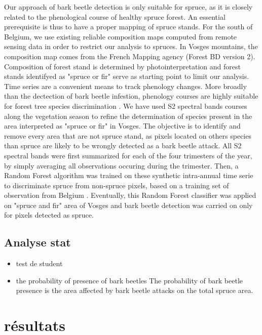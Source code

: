 \documentclass[3p,times]{elsarticle}
\begin{document}
Our approach of bark beetle detection is only suitable for spruce, as it is closely related to the phenological course of healthy spruce forest.
An essential prerequisite is thus to have a proper mapping of spruce stands.
For the south of Belgium, we use existing reliable composition maps \citep{bolyn_forest_2018} computed from remote sensing data in order to restrict our analysis to spruces.
In Vosges mountains, the composition map comes from the French Mapping agency (Forest BD version 2). 
Composition of forest stand is determined by photointerpretation and forest stands identifyed as "spruce or fir" serve as starting point to limit our analysis.
Time series are a convenient means to track phenology changes. 
More broadly than the dectection of bark beetle infestion, phenology courses are highly suitable for forest tree species discrimination \citep{lisein_discrimination_2015,grabska_forest_2019,ma_tree_2021}.
We have used S2 spectral bands courses along the vegetation season to refine the determination of species present in the area interpreted as "spruce or fir" in Vosges.
The objective is to identify and remove every area that are not spruce stand, as pixels located on others species than spruce are likely to be wrongly detected as a bark beetle attack.
All S2 spectral bands were first summarized for each of the four trimesters of the year, by simply averaging all observations occuring during the trimester.
Then, a Random Forest algorithm was trained on these synthetic intra-annual time serie to discriminate spruce from non-spruce pixels, based on a training set of observation from Belgium \citep{bolyn_forest_2018}.
Eventually, this Random Forest classifier was applied on "spruce and fir" area of Vosges and bark beetle detection was carried on only for pixels detected as spruce. 






\subsection{Analyse stat}
\begin{itemize}
	\item test de student
	\item the probability of presence of bark beetles
The probability of bark beetle presence is the area affected by bark beetle attacks on the total spruce area. 
\end{itemize}

\section{résultats}
\end{document}
